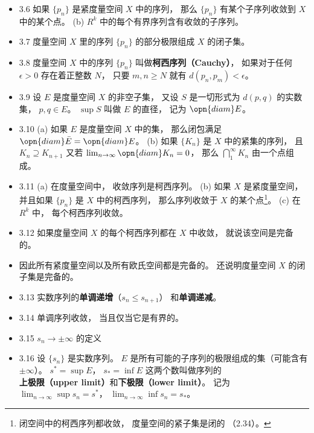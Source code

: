 \begin{itemize}
\item 3.6 如果 $\{p_n\}$ 是紧度量空间 $X$ 中的序列， 那么 $\{p_n\}$ 有某个子序列收敛到 $X$ 中的某个点。 (b) $R^k$ 中的每个有界序列含有收敛的子序列。

\item 3.7 度量空间 $X$ 里的序列 $\{p_n\}$ 的部分极限组成 $X$ 的闭子集。

\item 3.8 度量空间 $X$ 中的序列 $\{p_n\}$ 叫做\textbf{柯西序列（Cauchy）}， 如果对于任何 $\epsilon>0$ 存在着正整数 $N$， 只要 $m,n\geqslant N$ 就有 $d(p_n, p_m)<\epsilon$。

\item 3.9 设 $E$ 是度量空间 $X$ 的非空子集， 又设 $S$ 是一切形式为 $d(p,q)$ 的实数集， $p,q\in E$。 $\sup S$ 叫做 $E$ 的直径， 记为 $\opn{diam} E$。

\item 3.10 (a) 如果 $E$ 是度量空间 $X$ 中的集， 那么闭包满足 $\opn{diam}\bar E = \opn{diam} E$。 (b) 如果 $\{K_n\}$ 是 $X$ 中的紧集的序列， 且 $K_n \supseteq K_{n+1}$ 又若 $\lim_{n\to\infty} \opn{diam} K_n = 0$， 那么 $\bigcap_1^\infty K_n$ 由一个点组成。

\item 3.11 (a) 在度量空间中， 收敛序列是柯西序列。 (b) 如果 $X$ 是紧度量空间， 并且如果 $\{p_n\}$ 是 $X$ 中的柯西序列， 那么序列收敛于 $X$ 的某个点\footnote{闭空间中的柯西序列都收敛， 度量空间的紧子集是闭的 （2.34）。}。 (c) 在 $R^k$ 中， 每个柯西序列收敛。

\item 3.12 如果度量空间 $X$ 的每个柯西序列都在 $X$ 中收敛， 就说该空间是完备的。

\item 因此所有紧度量空间以及所有欧氏空间都是完备的。 还说明度量空间 $X$ 的闭子集是完备的。

\item 3.13 实数序列的\textbf{单调递增}（$s_n\leqslant s_{n+1}$） 和\textbf{单调递减}。

\item 3.14 单调序列收敛， 当且仅当它是有界的。

\item 3.15 $s_n\to \pm \infty$ 的定义

\item 3.16 设 $\{s_n\}$ 是实数序列。 $E$ 是所有可能的子序列的极限组成的集（可能含有 $\pm\infty$）。 $s^* = \sup E$， $s_* = \inf E$ 这两个数叫做序列的\textbf{上极限（upper limit）}和\textbf{下极限（lower limit）}。 记为 $\lim_{n\to\infty} \sup s_n = s^*$， $\lim_{n\to\infty} \inf s_n = s_*$。


\end{itemize}
